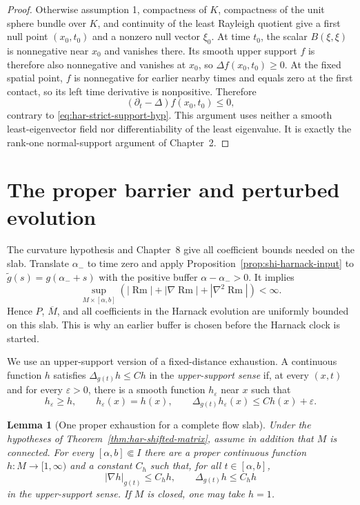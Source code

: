 \documentclass[10pt]{coll-l}
\newtheorem{lemma}[theorem]{Lemma}
\theoremstyle{definition}
\theoremstyle{remark}
\numberwithin{section}{chapter}
\numberwithin{equation}{chapter}
\newcommand{\Rm}{\operatorname{Rm}}
\begin{document}
\begin{proof}
Otherwise assumption 1, compactness of $K$, compactness of the unit sphere
bundle over $K$, and continuity of the least Rayleigh quotient give a first
null point $(x_0,t_0)$ and a nonzero null vector
$\xi_0$.  At time $t_0$, the scalar
$B(\xi,\xi)$ is nonnegative near $x_0$ and vanishes there.  Its smooth upper
support $f$ is therefore also nonnegative and vanishes at $x_0$, so
$\Delta f(x_0,t_0)\geq0$.  At the fixed spatial point, $f$ is nonnegative
for earlier nearby times and equals zero at the first contact, so its left
time derivative is nonpositive.  Therefore
\[
       (\partial_t-\Delta)f(x_0,t_0)\leq0,
\]
contrary to \eqref{eq:har-strict-support-hyp}.  This argument uses neither a
smooth least-eigenvector field nor differentiability of the least
eigenvalue.  It is exactly the rank-one normal-support argument of
Chapter~2.
\end{proof}

\section{The proper barrier and perturbed evolution}
\label{sec:har-proof-main}

The curvature hypothesis and Chapter~8 give all coefficient bounds needed
on the slab.  Translate $\alpha_-$ to time zero and apply
Proposition~\ref{prop:shi-harnack-input} to
$\widetilde g(s)=g(\alpha_-+s)$ with the positive buffer
$\alpha-\alpha_->0$.  It implies
\begin{equation}
 \sup_{M\times[\alpha,b]}
  (|\Rm|+|\nabla\Rm|+|\nabla^2\Rm|)<\infty.             \label{eq:har-two-derivative-slab}
\end{equation}
Hence $P$, $\overline M$, and all coefficients in the Harnack evolution are
uniformly bounded on this slab.  This is why an earlier buffer is chosen
before the Harnack clock is started.

We use an upper-support version of a fixed-distance exhaustion.  A continuous
function $h$ satisfies $\Delta_{g(t)}h\leq Ch$ in the
\emph{upper-support sense} if, at every $(x,t)$ and for every $\varepsilon>0$,
there is a smooth function $h_\varepsilon$ near $x$ such that
\begin{equation}
 h_\varepsilon\geq h,\qquad h_\varepsilon(x)=h(x),\qquad
 \Delta_{g(t)}h_\varepsilon(x)\leq Ch(x)+\varepsilon.   \label{eq:har-upper-support}
\end{equation}

\begin{lemma}[One proper exhaustion for a complete flow slab]
\label{lem:har-proper-exhaustion}
Under the hypotheses of Theorem~\ref{thm:har-shifted-matrix}, assume in
addition that $M$ is connected.  For every $[\alpha,b]\Subset I$ there are
a proper continuous function
$h:M\to[1,\infty)$ and a constant $C_h$ such that, for all
$t\in[\alpha,b]$,
\begin{equation}
        |\nabla h|_{g(t)}\leq C_hh,\qquad
        \Delta_{g(t)}h\leq C_hh                         \label{eq:har-exhaustion-bounds}
\end{equation}
in the upper-support sense.  If $M$ is closed, one may take $h=1$.
\end{lemma}
\end{document}
